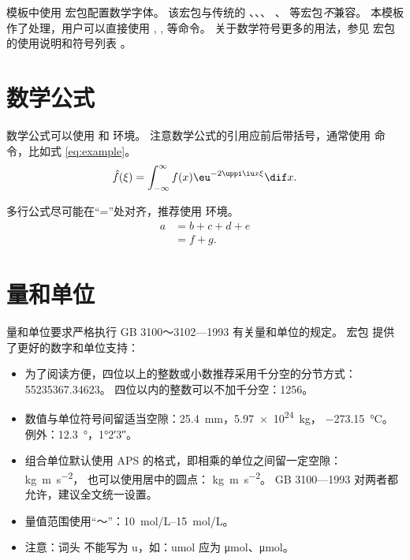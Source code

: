 模板中使用  宏包配置数学字体。
该宏包与传统的 、、、
、 等宏包\emph{不}兼容。
本模板作了处理，用户可以直接使用 , ,
 等命令。
关于数学符号更多的用法，参见  宏包的使用说明和符号列表
。



\section{数学公式}

数学公式可以使用  和  环境。
注意数学公式的引用应前后带括号，通常使用  命令，比如式 \eqref{eq:example}。
\begin{equation}
  \hat{f}(\xi) = \int_{-\infty}^\infty f(x) \eu^{-2 \uppi \iu x \xi} \dif x.
  \label{eq:example}
\end{equation}

多行公式尽可能在“=”处对齐，推荐使用  环境。
\begin{align}
  a & = b + c + d + e \\
    & = f + g.
\end{align}



\section{量和单位}

量和单位要求严格执行 GB 3100～3102—1993 有关量和单位的规定。
宏包  提供了更好的数字和单位支持：
\begin{itemize}
  \item 为了阅读方便，四位以上的整数或小数推荐采用千分空的分节方式：\num{55235367.34623}。
    四位以内的整数可以不加千分空：\num{1256}。
  \item 数值与单位符号间留适当空隙：\SI{25.4}{mm}，\SI{5.97e24}{\kilo\gram}，
    \SI{-273.15}{\degreeCelsius}。 例外：\SI{12.3}{\degree}，\ang{1;2;3}。
  \item 组合单位默认使用 APS 的格式，即相乘的单位之间留一定空隙： \si{kg.m.s^{-2}}，
    也可以使用居中的圆点： \si[inter-unit-product = \ensuremath{{}\cdot{}}]{kg.m.s^{-2}}。
    GB 3100—1993 对两者都允许，建议全文统一设置。
  \item 量值范围使用“～”：\SIrange{10}{15}{mol/L}。
  \item 注意：词头 \textmu{} 不能写为 u，如：\si{umol} 应为 \si{\micro\mole}、\si{\umol}。
\end{itemize}



